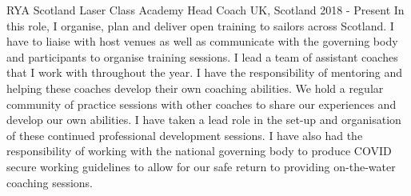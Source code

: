   \cventry
    {RYA Scotland} %
    {Laser Class Academy Head Coach} %
    {UK, Scotland} %
    {2018 - Present} %
    {
        In this role, I organise, plan and deliver open training to sailors 
        across Scotland. I have to liaise with host venues as well as 
        communicate with the governing body and participants to organise 
        training sessions. I lead a team of assistant coaches that I work 
        with throughout the year. I have the responsibility of mentoring and 
        helping these coaches develop their own coaching abilities. We hold a 
        regular community of practice sessions with other coaches to share 
        our experiences and develop our own abilities. I have taken a lead 
        role in the set-up and organisation of these continued professional 
        development sessions.\newline
        I have also had the responsibility of working with the national 
        governing body to produce COVID secure working guidelines to allow 
        for our safe return to providing on-the-water coaching sessions.
            \newline
    }
